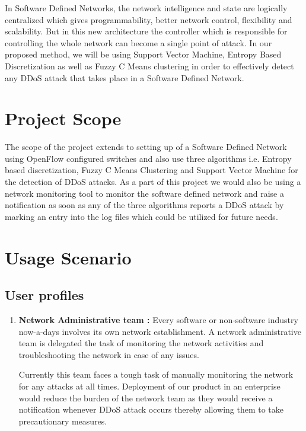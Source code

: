 \documentclass[12pt,a4paper,final]{report}
\begin{document}
In Software Defined Networks, the network intelligence and state are logically centralized which gives programmability, better network control, flexibility and scalability. But in this new architecture the controller which is responsible for controlling the whole network can become a single point of attack. In our proposed method, we will be using Support Vector Machine, Entropy Based Discretization as well as Fuzzy C Means clustering in order to effectively detect any DDoS attack that takes place in a Software Defined Network.

\section{Project Scope}
The scope of the project extends to setting up of a Software Defined Network using OpenFlow configured switches and also use three algorithms i.e. Entropy based discretization, Fuzzy C Means Clustering and Support Vector Machine for the detection of DDoS attacks. As a part of this project we would also be using a network monitoring tool to monitor the software defined network and raise a notification as soon as any of the three algorithms reports a DDoS attack by marking an entry into the log files which could be utilized for future needs.

\section{Usage Scenario}
\subsection{User profiles}
\begin{enumerate}
\item
\textbf{Network Administrative team :}
Every software or non-software industry now-a-days involves its own network establishment. A network administrative team is delegated the task of monitoring the network activities and troubleshooting the network in case of any issues. 
\par
Currently this team faces a tough task of manually monitoring the network for any attacks at all times.
Deployment of our product in an enterprise would reduce the burden of the network team as they would receive a notification whenever DDoS attack occurs thereby allowing them to take precautionary measures.
\end{enumerate}

\newpage
\end{document}
